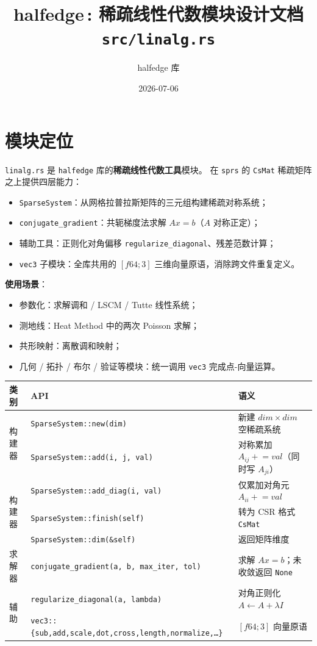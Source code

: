 \documentclass[11pt,a4paper]{article}
\title{\textbf{halfedge\,: 稀疏线性代数模块设计文档} \\ \large \texttt{src/linalg.rs}}
\author{halfedge 库}
\date{2026-07-06}
\begin{document}
\maketitle
\tableofcontents

\section{模块定位}

\texttt{linalg.rs} 是 \texttt{halfedge} 库的\textbf{稀疏线性代数工具}模块。
在 \texttt{sprs} 的 \texttt{CsMat} 稀疏矩阵之上提供四层能力：

\begin{itemize}
  \item \texttt{SparseSystem}：从网格拉普拉斯矩阵的三元组构建稀疏对称系统；
  \item \texttt{conjugate\_gradient}：共轭梯度法求解 $Ax = b$（$A$ 对称正定）；
  \item 辅助工具：正则化对角偏移 \texttt{regularize\_diagonal}、残差范数计算；
  \item \texttt{vec3} 子模块：全库共用的 $[f64;3]$ 三维向量原语，消除跨文件重复定义。
\end{itemize}

\textbf{使用场景}：
\begin{itemize}
  \item 参数化：求解调和 / LSCM / Tutte 线性系统；
  \item 测地线：Heat Method 中的两次 Poisson 求解；
  \item 共形映射：离散调和映射；
  \item 几何 / 拓扑 / 布尔 / 验证等模块：统一调用 \texttt{vec3} 完成点-向量运算。
\end{itemize}

\begin{center}
\renewcommand{\arraystretch}{1.18}
\begin{tabular}{@{}lll@{}}
  \toprule
  \textbf{类别} & \textbf{API} & \textbf{语义} \\
  \midrule
  \multirow{2}{*}{构建器}
    & \texttt{SparseSystem::new(dim)}         & 新建 $dim \times dim$ 空稀疏系统 \\
    & \texttt{SparseSystem::add(i, j, val)}   & 对称累加 $A_{ij} \mathrel{+}= val$（同时写 $A_{ji}$） \\
  \midrule
  \multirow{3}{*}{构建器}
    & \texttt{SparseSystem::add\_diag(i, val)}& 仅累加对角元 $A_{ii} \mathrel{+}= val$ \\
    & \texttt{SparseSystem::finish(self)}     & 转为 CSR 格式 \texttt{CsMat} \\
    & \texttt{SparseSystem::dim(\&self)}      & 返回矩阵维度 \\
  \midrule
  求解器
    & \texttt{conjugate\_gradient(a, b, max\_iter, tol)} & 求解 $Ax=b$；未收敛返回 \texttt{None} \\
  \midrule
  \multirow{2}{*}{辅助}
    & \texttt{regularize\_diagonal(a, lambda)} & 对角正则化 $A \leftarrow A + \lambda I$ \\
    & \texttt{vec3::\{sub,add,scale,dot,cross,length,normalize,\dots\}} & $[f64;3]$ 向量原语 \\
  \bottomrule
\end{tabular}
\end{center}
\end{document}
